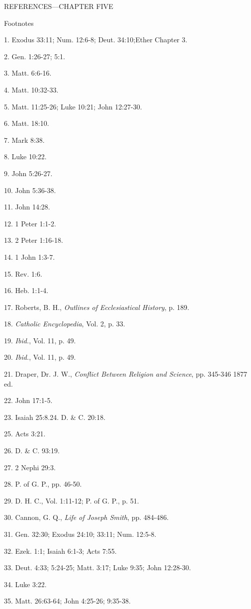 \newpage
REFERENCES—CHAPTER FIVE

Footnotes

1. Exodus 33:11; Num. 12:6-8; Deut. 34:10;Ether Chapter 3.

2. Gen. 1:26-27; 5:1.

3. Matt. 6:6-16.

4. Matt. 10:32-33.

5. Matt. 11:25-26; Luke 10:21; John 12:27-30.

6. Matt. 18:10.

7. Mark 8:38.

8. Luke 10:22.

9. John 5:26-27.

10. John 5:36-38.

11. John 14:28.

12. 1 Peter 1:1-2.

13. 2 Peter 1:16-18.

14. 1 John 1:3-7.

15. Rev. 1:6.

16. Heb. 1:1-4.

17. Roberts, B. H., \textit{Outlines of Ecclesiastical History}, p. 189.

18. \textit{Catholic Encyclopedia}, Vol. 2, p. 33.

19. \textit{Ibid.}, Vol. 11, p. 49.

20. \textit{Ibid.}, Vol. 11, p. 49.

21. Draper, Dr. J. W., \textit{Conflict Between Religion and Science}, pp. 345-346 1877 ed.

22. John 17:1-5.

23. Isaiah 25:8.24. D. \& C. 20:18.

25. Acts 3:21.

26. D. \& C. 93:19.

27. 2 Nephi 29:3.

28. P. of G. P., pp. 46-50.

29. D. H. C., Vol. 1:11-12; P. of G. P., p. 51.

30. Cannon, G. Q., \textit{Life of Joseph Smith}, pp. 484-486.

31. Gen. 32:30; Exodus 24:10; 33:11; Num. 12:5-8.

32. Ezek. 1:1; Isaiah 6:1-3; Acts 7:55.

33. Deut. 4:33; 5:24-25; Matt. 3:17; Luke 9:35; John 12:28-30.

34. Luke 3:22.

35. Matt. 26:63-64; John 4:25-26; 9:35-38.

